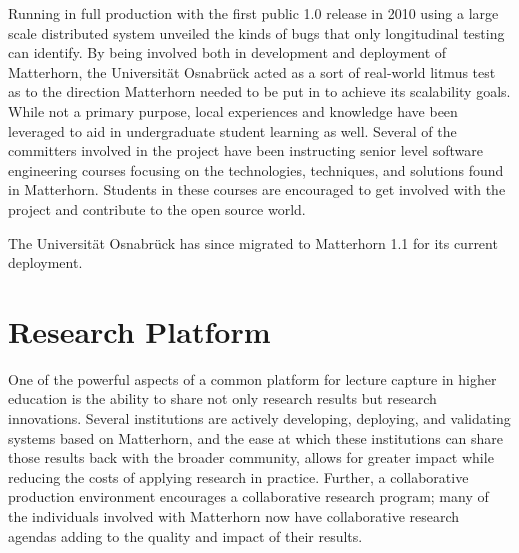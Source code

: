 \documentclass{sig-alternate}
\begin{document}
Running in full production with the first public 1.0 release in 2010 using a large scale distributed system unveiled the kinds of bugs that only longitudinal testing can identify.  By being involved both in development and deployment of Matterhorn, the Universit\"{a}t Osnabr\"{u}ck acted as a sort of real-world litmus test as to the direction Matterhorn needed to be put in to achieve its scalability goals.  While not a primary purpose, local experiences and knowledge have been leveraged to aid in undergraduate student learning as well.  Several of the committers involved in the project have been instructing senior level software engineering courses focusing on the technologies, techniques, and solutions found in Matterhorn.  Students in these courses are encouraged to get involved with the project and contribute to the open source world.

The Universit\"{a}t Osnabr\"{u}ck has since migrated to Matterhorn 1.1 for its current deployment.

\section{Research Platform}
One of the powerful aspects of a common platform for lecture capture in higher education is the ability to share not only research results but research innovations.  Several institutions are actively developing, deploying, and validating systems based on Matterhorn, and the ease at which these institutions can share those results back with the broader community, allows for greater impact while reducing the costs of applying research in practice.  Further, a collaborative production environment encourages a collaborative research program; many of the individuals involved with Matterhorn now have collaborative research agendas adding to the quality and impact of their results.
\end{document}
